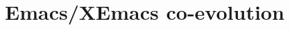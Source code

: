 \documentclass[format=acmsmall, review=false, screen=true]{acmart}
\begin{document}










\section{Emacs/XEmacs co-evolution}
\end{document}
